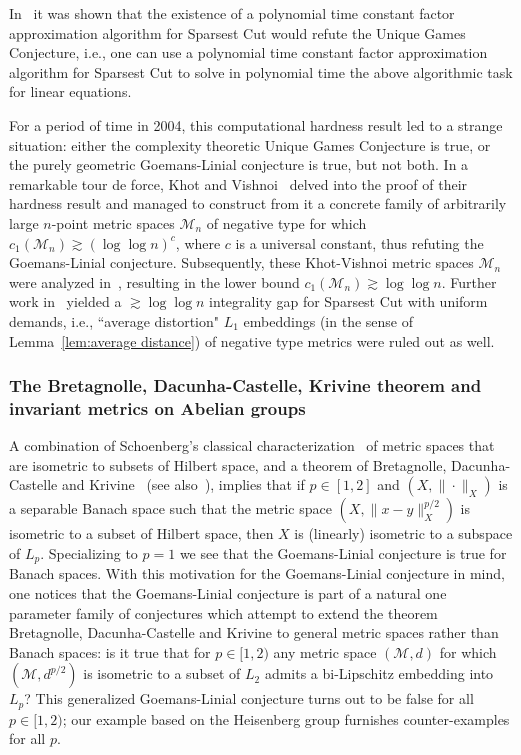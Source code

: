 \documentclass{icm2010}
\theoremstyle{definition}
\newcommand{\1}{\mathbf{1}}
\newcommand{\M}{\mathscr{M}}
\begin{document}
In~\cite{KV04,CKKRS06} it was shown that the existence of a
polynomial time constant factor approximation algorithm for Sparsest Cut would refute the Unique
Games Conjecture, i.e., one can use a polynomial time constant factor approximation algorithm for
Sparsest Cut to solve in polynomial time the above algorithmic task
for linear equations.

For a period of time in 2004, this computational hardness result led to a strange situation: either the complexity theoretic Unique Games Conjecture is true, or the purely geometric Goemans-Linial conjecture is true, but not both. In a remarkable tour de force, Khot and Vishnoi~\cite{KV04} delved into the proof of their hardness result and managed to construct from it a concrete family of arbitrarily large $n$-point metric spaces $\M_n$ of negative type for which $c_1(\M_n)\gtrsim (\log \log n)^c$, where $c$ is a universal constant, thus refuting the Goemans-Linial conjecture. Subsequently, these Khot-Vishnoi metric spaces $\M_n$ were analyzed in~\cite{KR06}, resulting in the lower bound $c_1(\M_n)\gtrsim \log \log n$. Further work in~\cite{DKSV06} yielded a $\gtrsim \log\log n$ integrality gap for Sparsest Cut with uniform demands, i.e., ``average distortion"  $L_1$ embeddings (in the sense of Lemma~\ref{lem:average distance}) of negative type metrics   were ruled out as well.




\subsubsection{The Bretagnolle, Dacunha-Castelle, Krivine theorem and invariant metrics on Abelian groups}\label{sec:krivine}
A combination of Schoenberg's classical
characterization~\cite{schoenberg} of metric spaces that are
isometric to subsets of Hilbert space, and a theorem of Bretagnolle,
Dacunha-Castelle and Krivine~\cite{BDCK66} (see
also~\cite{WellWill}), implies that if $p\in [1,2]$ and
$(X,\|\cdot\|_X)$ is a separable Banach space such that the metric
space $(X,\|x-y\|_X^{p/2})$ is isometric to a subset of Hilbert
space, then $X$ is (linearly) isometric to a subspace of $L_p$.
Specializing to $p=1$ we see that the Goemans-Linial conjecture is
true for Banach spaces. With this motivation for the Goemans-Linial
conjecture in mind, one notices that the Goemans-Linial conjecture
is part of a natural one parameter family of conjectures which
attempt to extend the theorem Bretagnolle, Dacunha-Castelle and
Krivine to general metric spaces rather than Banach spaces: is it
true that for $p\in [1,2)$ any metric space $(\M,d)$ for which
$(\M,d^{p/2})$ is isometric to a subset of $L_2$ admits a
bi-Lipschitz embedding into $L_p$? This generalized Goemans-Linial
conjecture turns out to be false for all $p\in [1,2)$; our example
based on the Heisenberg group furnishes counter-examples for all
$p$.
\end{document}
